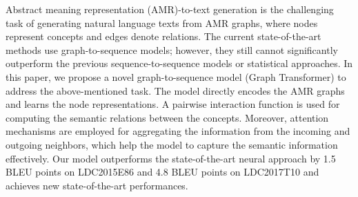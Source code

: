 Abstract meaning representation (AMR)-to-text generation is the challenging task of generating natural language texts from AMR graphs, where nodes represent concepts and edges denote relations. The current state-of-the-art methods use graph-to-sequence models; however, they still cannot significantly outperform the previous sequence-to-sequence models or statistical approaches. In this paper, we propose a novel graph-to-sequence model (Graph Transformer) to address the above-mentioned task. The model directly encodes the AMR graphs and learns the node representations. A pairwise interaction function is used for computing the semantic relations between the concepts. Moreover, attention mechanisms are employed for aggregating the information from the incoming and outgoing neighbors, which help the model to capture the semantic information effectively. Our model outperforms the state-of-the-art neural approach by 1.5 BLEU points on LDC2015E86 and 4.8 BLEU points on LDC2017T10 and achieves new state-of-the-art performances.